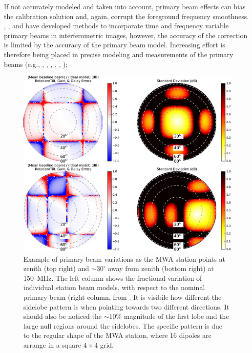 \begin{itemize}
If not accurately modeled and taken into account, primary beam effects can bias the calibration solution and, again, corrupt the foreground frequency smoothness.  \cite{bhatnagar08}, \cite{bernardi11}, \cite{sullivan12} and \cite{tasse13} have developed methods to incorporate time and frequency variable primary beams in interferometric images, however, the accuracy of the correction is limited by the accuracy of the primary beam model. Increasing effort is therefore being placed in precise modeling and measurements of the  primary beams (e.g., \cite{pupillo15}, \cite{trott16}, \cite{deleraacedo17}, \cite{trott17a}, \cite{jacobs17}, \cite{deleraacedo18});
\begin{figure}[]
\begin{center}
\includegraphics[width=1.\textwidth]{Bernardi/mwa_beams_err}
\end{center}
\caption{Example of primary beam variations as the MWA station points at zenith (top right) and $\sim 30^\circ$ away from zenith (bottom right) at 150~MHz. The left column shows the fractional variation of individual station beam models, with respect to the nominal primary beam (right column, from \cite{neben16}. It is visibile how different the sidelobe pattern is when pointing towards two different directions. It should also be noticed the $\sim 10\%$ magnitude of the first lobe and the large null regions around the sidelobes. The specific pattern is due to the regular shape of the MWA station, where 16 dipoles are arrange in a square $4 \times 4$ grid.}
\label{fig:fig3}
\end{figure}



\end{itemize}
